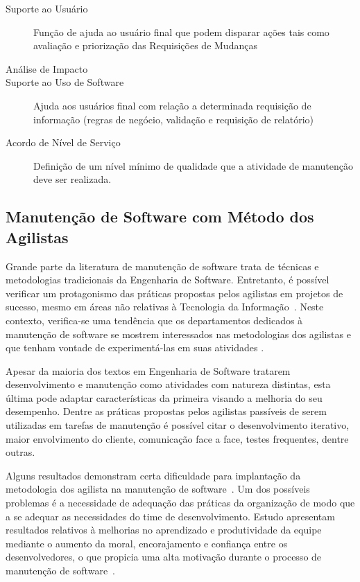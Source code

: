 \begin{description}
	\item[Suporte ao Usuário] Função de ajuda ao usuário final
		que podem disparar ações tais como avaliação e priorização das
		Requisições de Mudanças
   	\item [Análise de Impacto] 
   	\item [Suporte ao Uso de Software] Ajuda aos
		usuários final com relação a determinada requisição de informação
		(regras de negócio, validação e requisição de relatório)
	\item [Acordo de Nível de Serviço] Definição de um nível mínimo de qualidade que a
		atividade de manutenção deve ser realizada.
\end{description}

\subsection{Manutenção de Software com Método dos Agilistas}
\label{sub:manutenção_de_software_com_método_dos_agilistas}

Grande parte da literatura de manutenção de software trata de técnicas e
metodologias tradicionais da Engenharia de Software. Entretanto, é possível
verificar um protagonismo das práticas propostas pelos agilistas em projetos de
sucesso, mesmo em áreas não relativas à Tecnologia da
Informação~\cite{Serrador2015}. Neste contexto, verifica-se uma tendência que os
departamentos dedicados à manutenção de software se mostrem interessados nas
metodologias dos agilistas e que tenham vontade de experimentá-las em suas
atividades \cite{Heeager2015}.

Apesar da maioria dos textos em Engenharia de Software tratarem desenvolvimento
e manutenção como atividades com natureza distintas, esta última pode adaptar
características da primeira visando a melhoria do seu desempenho. Dentre as
práticas propostas pelos agilistas passíveis de serem utilizadas em tarefas de
manutenção é possível citar o desenvolvimento iterativo, maior envolvimento do
cliente, comunicação face a face, testes frequentes, dentre outras.

Alguns resultados demonstram certa dificuldade para implantação da metodologia
dos agilista na manutenção de software~\cite{1402140}. Um dos possíveis
problemas é a necessidade de adequação das práticas da organização de modo que a
se adequar as necessidades do time de desenvolvimento.  Estudo apresentam
resultados relativos à melhorias no aprendizado e produtividade da equipe
mediante o aumento da moral, encorajamento e confiança entre os desenvolvedores,
o que propicia uma alta motivação durante o processo de manutenção de
software~\cite{Choudhari:2014:EIM:2557833.2557845}.

